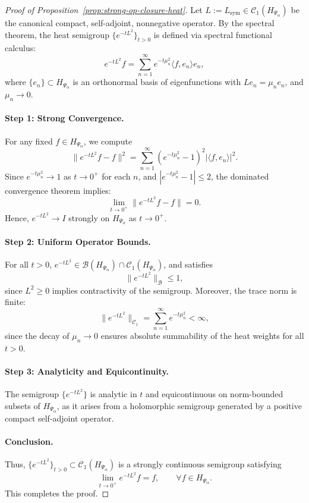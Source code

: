 \begin{proof}[Proof of Proposition~\ref{prop:strong-op-closure-heat}]
Let \( L := L_{\mathrm{sym}} \in \mathcal{C}_1(H_{\Psi_\alpha}) \) be the canonical compact, self-adjoint, nonnegative operator. By the spectral theorem, the heat semigroup \( \{ e^{-tL^2} \}_{t > 0} \) is defined via spectral functional calculus:
\[
e^{-tL^2} f = \sum_{n=1}^\infty e^{-t \mu_n^2} \langle f, e_n \rangle e_n,
\]
where \( \{e_n\} \subset H_{\Psi_\alpha} \) is an orthonormal basis of eigenfunctions with \( L e_n = \mu_n e_n \), and \( \mu_n \to 0 \).

\paragraph{Step 1: Strong Convergence.}
For any fixed \( f \in H_{\Psi_\alpha} \), we compute
\[
\| e^{-t L^2} f - f \|^2 = \sum_{n=1}^\infty \left( e^{-t \mu_n^2} - 1 \right)^2 |\langle f, e_n \rangle|^2.
\]
Since \( e^{-t \mu_n^2} \to 1 \) as \( t \to 0^+ \) for each \( n \), and \( \left| e^{-t \mu_n^2} - 1 \right| \le 2 \), the dominated convergence theorem implies:
\[
\lim_{t \to 0^+} \| e^{-t L^2} f - f \| = 0.
\]
Hence, \( e^{-tL^2} \to I \) strongly on \( H_{\Psi_\alpha} \) as \( t \to 0^+ \).

\paragraph{Step 2: Uniform Operator Bounds.}
For all \( t > 0 \), \( e^{-t L^2} \in \mathcal{B}(H_{\Psi_\alpha}) \cap \mathcal{C}_1(H_{\Psi_\alpha}) \), and satisfies
\[
\| e^{-t L^2} \|_{\mathcal{B}} \le 1,
\]
since \( L^2 \ge 0 \) implies contractivity of the semigroup. Moreover, the trace norm is finite:
\[
\| e^{-t L^2} \|_{\mathcal{C}_1} = \sum_{n=1}^\infty e^{-t \mu_n^2} < \infty,
\]
since the decay of \( \mu_n \to 0 \) ensures absolute summability of the heat weights for all \( t > 0 \).

\paragraph{Step 3: Analyticity and Equicontinuity.}
The semigroup \( \{ e^{-t L^2} \} \) is analytic in \( t \) and equicontinuous on norm-bounded subsets of \( H_{\Psi_\alpha} \), as it arises from a holomorphic semigroup generated by a positive compact self-adjoint operator.

\paragraph{Conclusion.}
Thus, \( \{ e^{-t L^2} \}_{t > 0} \subset \mathcal{C}_1(H_{\Psi_\alpha}) \) is a strongly continuous semigroup satisfying
\[
\lim_{t \to 0^+} e^{-t L^2} f = f, \qquad \forall f \in H_{\Psi_\alpha}.
\]
This completes the proof.
\end{proof}
